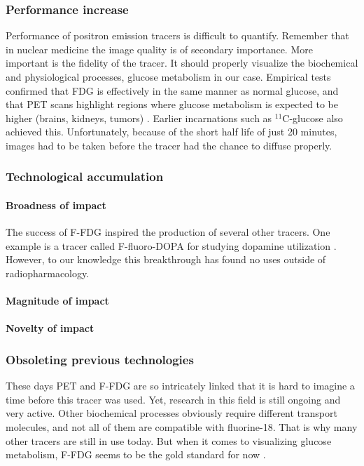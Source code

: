 \subsubsection{Performance increase}
Performance of positron emission tracers is difficult to quantify. Remember that
in nuclear medicine the image quality is of secondary importance. More important
is the fidelity of the tracer. It should properly visualize the biochemical and
physiological processes, glucose metabolism in our case. Empirical tests
confirmed that FDG is effectively in the same manner as normal glucose, and that
PET scans highlight regions where glucose metabolism is expected to be higher
(brains, kidneys, tumors) \cite{radiopharma}. Earlier incarnations such as
$^{11}$C-glucose also achieved this. Unfortunately, because of the short half
life of just 20 minutes, images had to be taken before the tracer had the chance
to diffuse properly. 

\subsubsection{Technological accumulation}
\paragraph{Broadness of impact}
The success of F-FDG inspired the production of several other tracers. One
example is a tracer called F-fluoro-DOPA for studying dopamine utilization
\cite{radiopharma}. However, to our knowledge this breakthrough has found no
uses outside of radiopharmacology.

\paragraph{Magnitude of impact}

\paragraph{Novelty of impact}

\subsubsection{Obsoleting previous technologies}
These days PET and F-FDG are so intricately linked that it is hard to imagine a
time before this tracer was used. Yet, research in this field is still ongoing
and very active. Other biochemical processes obviously require different
transport molecules, and not all of them are compatible with fluorine-18. That
is why many other tracers are still in use today. But when it comes to
visualizing glucose metabolism, F-FDG seems to be the gold standard for now
\cite{radiopharma}.

